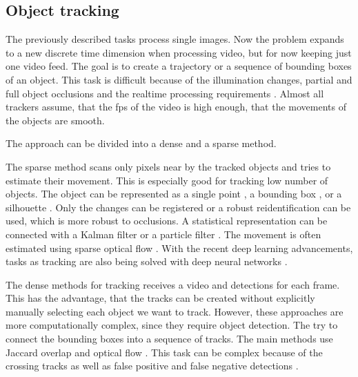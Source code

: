 \documentclass[a4paper,12pt,titlepage, twoside]{article}
\numberwithin{figure}{section}
\begin{document}
\subsection{Object tracking}

The previously described tasks process single images. Now the problem expands to a new discrete time dimension when processing video, but for now keeping just one video feed. The goal is to create a trajectory or a sequence of bounding boxes of an object. This task is difficult because of the illumination changes, partial and full object occlusions and the realtime processing requirements \cite{yilmaz2006object}. Almost all trackers assume, that the fps of the video is high enough, that the movements of the objects are smooth. 

The approach can be divided into a dense and a sparse method. 

The sparse method scans only pixels near by the tracked objects and tries to estimate their movement. This is especially good for tracking low number of objects. The object can be represented as a single point \cite{kale2015moving}, a bounding box \cite{comaniciu2003kernel, porikli2005multi, yilmaz2007object, elgammal2002background}, or a silhouette \cite{isard2001bramble}. Only the changes can be registered \cite{kale2015moving} or a robust reidentification \cite{veenman1998fast} can be used, which is more robust to occlusions. A statistical representation can be connected with a Kalman filter \cite{banerjee2008multi} or a particle filter \cite{zhong2012moving}. The movement is often estimated using sparse optical flow \cite{kale2015moving, mae1996object}. With the recent deep learning advancements, tasks as tracking are also being solved with deep neural networks \cite{bertinetto2016fully, held2016learning, gladh2016deep, gaidon2016virtual, lee2016globally}.

The dense methods for tracking receives a video and detections for each frame. This has the advantage, that the tracks can be created without explicitly manually selecting each object we want to track. However, these approaches are more computationally complex, since they require object detection. The try to connect the bounding boxes into a sequence of tracks. The main methods use Jaccard overlap \cite{tan2005introduction, benfold2011stable} and optical flow \cite{chen2011tracking}. This task can be complex because of the crossing tracks as well as false positive and false negative detections \cite{joshi2012survey, elgammal2002background}.
\end{document}
